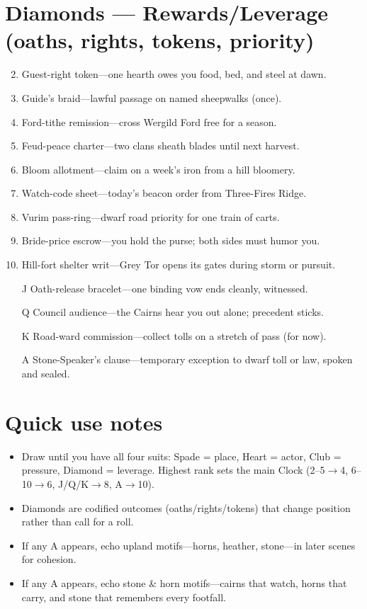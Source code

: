 \section*{Diamonds --- Rewards/Leverage (oaths, rights, tokens, priority)}
\label{sec:ubral-rewards}
\begin{enumerate}
\setcounter{enumi}{1}
\item Guest-right token---one hearth owes you food, bed, and steel at dawn.
\item Guide's braid---lawful passage on named sheepwalks (once).
\item Ford-tithe remission---cross Wergild Ford free for a season.
\item Feud-peace charter---two clans sheath blades until next harvest.
\item Bloom allotment---claim on a week's iron from a hill bloomery.
\item Watch-code sheet---today's beacon order from Three-Fires Ridge.
\item Vurim pass-ring---dwarf road priority for one train of carts.
\item Bride-price escrow---you hold the purse; both sides must humor you.
\item Hill-fort shelter writ---Grey Tor opens its gates during storm or pursuit.
\item[J] Oath-release bracelet---one binding vow ends cleanly, witnessed.
\item[Q] Council audience---the Cairns hear you out alone; precedent sticks.
\item[K] Road-ward commission---collect tolls on a stretch of pass (for now).
\item[A] Stone-Speaker's clause---temporary exception to dwarf toll or law, spoken and sealed.
\end{enumerate}

\section*{Quick use notes}
\label{sec:ubral-quick-use}
\begin{itemize}
\item Draw until you have all four suits: Spade = place, Heart = actor, Club = pressure, Diamond = leverage. Highest rank sets the main Clock (2--5$\rightarrow$4, 6--10$\rightarrow$6, J/Q/K$\rightarrow$8, A$\rightarrow$10).
\item Diamonds are codified outcomes (oaths/rights/tokens) that change position rather than call for a roll.
\item If any A appears, echo upland motifs---horns, heather, stone---in later scenes for cohesion.
\item If any A appears, echo stone \& horn motifs---cairns that watch, horns that carry, and stone that remembers every footfall.
\end{itemize}

